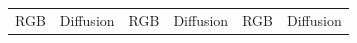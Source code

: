 \begin{figure}[htp!]
    \centering
    \begin{tabularx}{\textwidth}{Y Y Y !{\space} Y Y Y !{\space}}
        RGB                                                                                                              & Diffusion                                                                               & RGB                                                                                                              & Diffusion                                                                               & RGB                                                                                                              & Diffusion                                                                               \\

\end{tabularx}
\end{figure}
